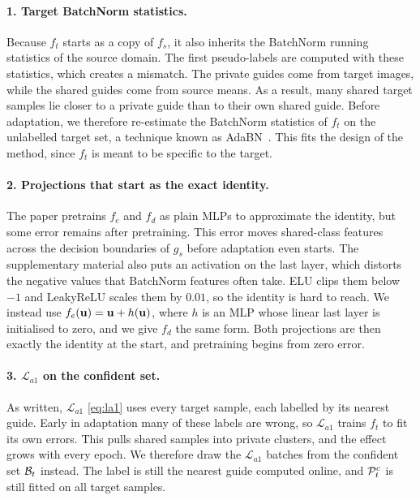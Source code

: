 \paragraph{1. Target BatchNorm statistics.}
Because $f_t$ starts as a copy of $f_s$, it also inherits the BatchNorm running statistics of the source domain.
The first pseudo-labels are computed with these statistics, which creates a mismatch.
The private guides come from target images, while the shared guides come from source means.
As a result, many shared target samples lie closer to a private guide than to their own shared guide.
Before adaptation, we therefore re-estimate the BatchNorm statistics of $f_t$ on the unlabelled target set, a technique known as AdaBN~\citep{li2018adabn}.
This fits the design of the method, since $f_t$ is meant to be specific to the target.

\paragraph{2. Projections that start as the exact identity.}
The paper pretrains $f_e$ and $f_d$ as plain MLPs to approximate the identity, but some error remains after pretraining.
This error moves shared-class features across the decision boundaries of $g_s$ before adaptation even starts.
The supplementary material also puts an activation on the last layer, which distorts the negative values that BatchNorm features often take.
ELU clips them below $-1$ and LeakyReLU scales them by $0.01$, so the identity is hard to reach.
We instead use $f_e(\mathbf{u})=\mathbf{u}+h(\mathbf{u})$, where $h$ is an MLP whose linear last layer is initialised to zero, and we give $f_d$ the same form.
Both projections are then exactly the identity at the start, and pretraining begins from zero error.

\paragraph{3. $\mathcal{L}_{a1}$ on the confident set.}
As written, $\mathcal{L}_{a1}$ \eqref{eq:la1} uses every target sample, each labelled by its nearest guide.
Early in adaptation many of these labels are wrong, so $\mathcal{L}_{a1}$ trains $f_t$ to fit its own errors.
This pulls shared samples into private clusters, and the effect grows with every epoch.
We therefore draw the $\mathcal{L}_{a1}$ batches from the confident set $\mathcal{B}_t$ instead.
The label is still the nearest guide computed online, and $\mathcal{P}_t^c$ is still fitted on all target samples.

